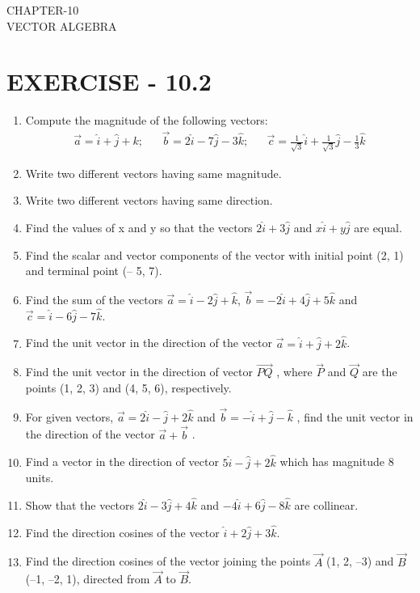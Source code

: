 \documentclass[12pt]{article}
\begin{document}
\begin{center}
\textbf\large{CHAPTER-10 \\ VECTOR ALGEBRA}
\end{center}
\section{EXERCISE - 10.2}
\begin{enumerate}
\item Compute the magnitude of the following vectors:
\begin{align*}
\vec{a}=\hat{i}+\hat{j}+k;&&\vec{b}=2\hat{i}-7\hat{j}-3\hat{k};&&\vec{c}=\frac{1}{\sqrt{3}}\hat{i}+\frac{1}{\sqrt{3}}\hat{j}-\frac{1}{3}\hat{k}
\end{align*}
\item Write two different vectors having same magnitude.
\item Write two different vectors having same direction.
\item Find the values of x and y so that the vectors $2\hat{i}+3\hat{j}$ and $x\hat{i}+y\hat{j}$ are equal.
\item Find the scalar and vector components of the vector with initial point (2, 1) and
terminal point (– 5, 7).
\item Find the sum of the vectors $\vec{a}=\hat{i}-2\hat{j}+\hat{k}$, $\vec{b}=-2\hat{i}+4\hat{j}+5\hat{k}$ and $\vec{c}=\hat{i}-6\hat{j}-7\hat{k}$.
\item Find the unit vector in the direction of the vector $\vec{a}=\hat{i}+\hat{j}+2\hat{k}$.
\item Find the unit vector in the direction of vector $\overrightarrow{PQ}$ , where $\vec{P}$ and $\Vec{Q}$ are the points
(1, 2, 3) and (4, 5, 6), respectively.
\item For given vectors, $\vec{a}=2\hat{i}-\hat{j}+2\hat{k}$ and $\vec{b}=-\hat{i}+\hat{j}-\hat{k}$ , find the unit vector in the
direction of the vector $\vec{a}+\vec{b}$
.
\item Find a vector in the direction of vector $5\hat{i}-\hat{j}+2\hat{k}$ which has magnitude 8 units.
\item Show that the vectors $2\hat{i}-3\hat{j}+4\hat{k}$ and $-4\hat{i}+6\hat{j}-8\hat{k}$ are collinear.
\item Find the direction cosines of the vector $\hat{i}+2\hat{j}+3\hat{k}$.
\item Find the direction cosines of the vector joining the points $\Vec{A}$ (1, 2, –3) and
$\Vec{B}$(–1, –2, 1), directed from $\Vec{A}$ to $\Vec{B}$.

\end{enumerate}
\end{document}
